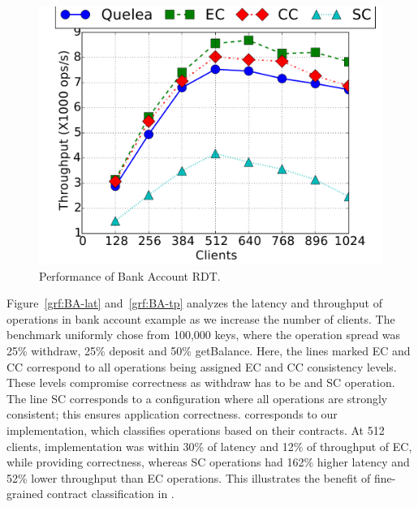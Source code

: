\begin{figure}
  \centering
	\includegraphics[width=0.5\columnwidth]{Figures/BA-legend.pdf}
	\caption{Performance of Bank Account RDT.}
  \label{grf:BA_perf}
\end{figure}

Figure~\ref{grf:BA-lat} and~\ref{grf:BA-tp} analyzes the latency and throughput
of operations in bank account example as we increase the number of clients. The
benchmark uniformly chose from 100,000 keys, where the operation spread was
25\% withdraw, 25\% deposit and 50\% getBalance. Here, the lines marked EC and
CC correspond to all operations being assigned EC and CC consistency levels.
These levels compromise correctness as withdraw has to be and SC operation. The
line SC corresponds to a configuration where all operations are strongly
consistent; this ensures application correctness. \name corresponds to our
implementation, which classifies operations based on their contracts. At 512
clients, \name implementation was within 30\% of latency and 12\% of throughput
of EC, while providing correctness, whereas SC operations had 162\% higher
latency and 52\% lower throughput than EC operations. This illustrates the
benefit of fine-grained contract classification in \name.

